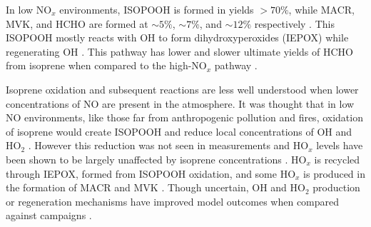       In low NO$_x$ environments, ISOPOOH is formed in yields $> 70\%$, while MACR, MVK, and HCHO are formed at $\sim 5\%$, $\sim 7\%$, and $\sim 12\%$ respectively \parencite{Paulot2009b,Mao2013}.
      This ISOPOOH mostly reacts with OH to form dihydroxyperoxides (IEPOX) while regenerating OH \parencite{Mao2013}.
      This pathway has lower and slower ultimate yields of HCHO from isoprene 
      when compared to the high-NO$_x$ pathway \parencite{Palmer2006}.
      
      Isoprene oxidation and subsequent reactions are less well understood when lower concentrations of NO are present in the atmosphere.
      It was thought that in low NO environments, like those far from anthropogenic pollution and fires, oxidation of isoprene would create ISOPOOH and reduce local concentrations of OH and HO$_2$ \parencite{Guenther2000,Paulot2009b}.
      However this reduction was not seen in measurements and HO$_x$ levels 
      have been shown to be largely unaffected by isoprene concentrations 
      \parencite{Paulot2009b}.
      HO$_x$ is recycled through IEPOX, formed from ISOPOOH oxidation, and some HO$_x$ is produced in the formation of MACR and MVK \parencite{Paulot2009b}.
      Though uncertain, OH and HO$_2$ production or regeneration mechanisms have improved model outcomes when compared against campaigns \parencite{Peeters2010,Crounse2012}.
      
